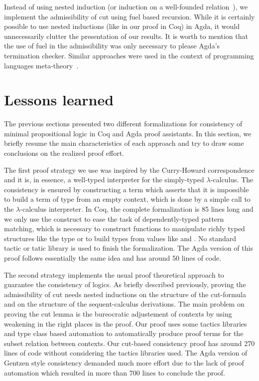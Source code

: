 Instead of using nested induction (or induction on a well-founded relation~\cite{Bertot04}), we implement the
admissibility of cut using fuel based recursion. While it is certainly possible to use nested inductions
(like in our proof in Coq) in Agda, it would unnecessarily clutter the presentation of our results. It is worth to
mention that the use of fuel in the admissibility was only necessary to please Agda's termination checker. Similar
approaches were used in the context of programming languages meta-theory~\cite{Amin17}.


\section{Lessons learned}\label{sec:lessons}


The previous sections presented two different formalizations for consistency of minimal
propositional logic in Coq and Agda proof assistants. In this section, we briefly resume the
main characteristics of each approach and try to draw some conclusions on the
realized proof effort.


The first proof strategy we use was inspired by the Curry-Howard correspondence and it is,
in essence, a well-typed interpreter for the
simply-typed $\lambda$-calculus. The consistency is ensured by constructing a term
which asserts that it is impossible to build a term of type  from an empty
context, which is done by a simple call to the $\lambda$-calculus interpreter.
In Coq, the complete formalization is 85 lines long and we only use the  construct
to ease the task of dependently-typed pattern matching, which is necessary
to construct functions to manipulate richly typed structures like the type  or to
build types from values like  and . No standard tactic or
tatic library is used to finish the formalization. The Agda version of this proof
follows essentially the same idea and has around 50 lines of code.


The second strategy implements the usual proof theoretical approach to guarantee
the consistency of logics. As briefly described previously, proving
the admissibility of cut needs nested inductions on the structure of the cut-formula
and on the structure of the sequent-calculus derivations. The main problem on proving
the cut lemma is the bureocratic adjustement of contexts by using weakening in the
right places in the proof. Our proof uses some tactics libraries~\cite{Chlipala13, Pierce18}
and type class based automation to automatically produce proof terms for the subset relation
between contexts. Our cut-based consistency proof has around 270 lines of code without
considering the tactics libraries used. The Agda version of Gentzen style consistency demanded
much more effort due to the lack of proof automation which resulted in more than 700 lines to conclude
the proof.


